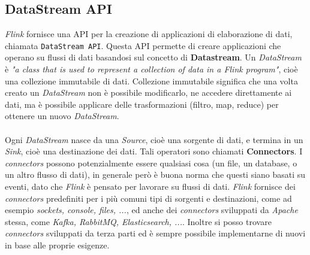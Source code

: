 \subsection{DataStream API}
\label{subsec:datastream_api}
\textit{Flink} fornisce una API per la creazione di applicazioni di elaborazione di dati, chiamata \texttt{DataStream API}.
Questa API permette di creare applicazioni che operano su flussi di dati basandosi sul concetto di \textbf{Datastream}.
Un \textit{DataStream} è \textit{"a class that is used to represent a collection of data in a Flink program"}\cite{flinkwebsite}, cioè una collezione 
immutabile di dati. Collezione immutabile significa che una volta creato un \textit{DataStream} non è possibile modificarlo, ne accedere direttamente ai dati,
ma è possibile applicare delle trasformazioni (filtro, map, reduce) per ottenere un nuovo \textit{DataStream}.\\\\
Ogni \textit{DataStream} nasce da una \textit{Source}, cioè una sorgente di dati, e termina in un \textit{Sink}, cioè una destinazione dei dati. 
Tali operatori sono chiamati \textbf{Connectors}.
I \textit{connectors} possono potenzialmente essere qualsiasi cosa (un file, un database, o un altro flusso di dati), 
in generale però è buona norma che questi siano basati su eventi, dato che \textit{Flink} è pensato per lavorare su flussi di dati.
\textit{Flink} fornisce dei \textit{connectors} predefiniti per i più comuni tipi di sorgenti e destinazioni, come ad esempio \textit{sockets, console, files, ...},
ed anche dei \textit{connectors} sviluppati da \textit{Apache} stessa, come \textit{Kafka, RabbitMQ, Elasticsearch, ...}. 
Inoltre si posso trovare \textit{connectors} sviluppati da terza parti ed è sempre possibile implementarne di nuovi in base alle proprie esigenze.  


